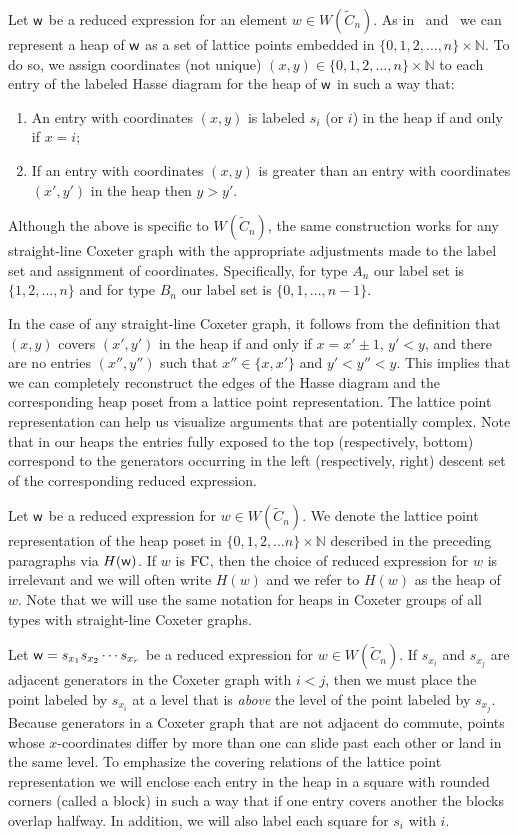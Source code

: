 Let $\mathsf{w}$ be a reduced expression for an element $w \in W(\widetilde{C}_n)$. As in~\cite{Billey2007} and~\cite{Ernst2010} we can represent a heap of $\mathsf{w}$ as a set of lattice points embedded in $\{0,1,2,\ldots, n\} \times \mathbb{N}$. To do so, we assign coordinates (not unique) $(x,y) \in \{0,1,2,\ldots, n\} \times \mathbb{N}$ to each entry of the labeled Hasse diagram for the heap of $\mathsf{w}$ in such a way that:
\begin{enumerate}[leftmargin=2cm]
\item An entry with coordinates $(x,y)$ is labeled $s_i$ (or $i$) in the heap if and only if $x = i$; 

\item If an entry with coordinates $(x,y)$ is greater than an entry with coordinates $(x',y')$ in the heap then $y > y'$.
\end{enumerate}

Although the above is specific to $W(\widetilde{C}_n)$, the same construction works for any straight-line Coxeter graph with the appropriate adjustments made to the label set and assignment of coordinates. Specifically, for type $A_n$ our label set is $\{1,2, \ldots, n\}$ and for type $B_n$ our label set is $\{0,1, \ldots, n-1\}$.

In the case of any straight-line Coxeter graph, it follows from the definition that $(x,y)$ covers $(x',y')$ in the heap if and only if $x = x' \pm 1$, $y'< y$, and there are no entries $(x'', y'')$ such that $x'' \in \{x, x'\}$ and $y'< y'' < y$. This implies that we can completely reconstruct the edges of the Hasse diagram and the corresponding heap poset from a lattice point representation. The lattice point representation can help us visualize arguments that are potentially complex. Note that in our heaps the entries fully exposed to the top (respectively, bottom) correspond to the generators occurring in the left (respectively, right) descent set of the corresponding reduced expression.

Let $\mathsf{w}$ be a reduced expression for $w \in W(\widetilde{C}_n)$. We denote the lattice point representation of the heap poset in $\{0,1,2, \ldots n\} \times \mathbb{N}$ described in the preceding paragraphs via $H(\mathsf{w})$. If $w$ is $\mathrm{FC}$, then the choice of reduced expression for $w$ is irrelevant and we will often write $H(w)$ and we refer to $H(w)$ as the heap of $w$. Note that we will use the same notation for heaps in Coxeter groups of all types with straight-line Coxeter graphs.

Let $\mathsf{w}=s_{x_1}s_{x_2}\cdots s_{x_r}$ be a reduced expression for $w \in W(\widetilde{C}_n)$. If $s_{x_i}$ and $s_{x_j}$ are adjacent generators in the Coxeter graph with $i<j$, then we must place the point labeled by $s_{x_i}$ at a level that is \emph{above} the level of the point labeled by $s_{x_j}$. Because generators in a Coxeter graph that are not adjacent do commute, points whose $x$-coordinates differ by more than one can slide past each other or land in the same level. To emphasize the covering relations of the lattice point representation we will enclose each entry in the heap in a square with rounded corners (called a block) in such a way that if one entry covers another the blocks overlap halfway. In addition, we will also label each square for $s_i$ with $i$.

